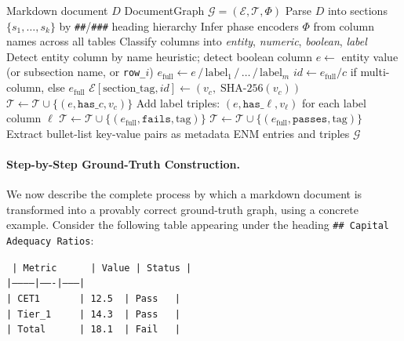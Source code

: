 \documentclass[11pt]{article}
\begin{document}
\begin{algorithm}[t]
\caption{Document Ingestion Pipeline}
\label{alg:ingest}
\begin{algorithmic}[1]
\REQUIRE Markdown document $D$
\ENSURE DocumentGraph $\mathcal{G} = (\mathcal{E}, \mathcal{T}, \Phi)$
\STATE Parse $D$ into sections $\{s_1, \ldots, s_k\}$ by \texttt{\#\#}/\texttt{\#\#\#} heading hierarchy
\STATE Infer phase encoders $\Phi$ from column names across all tables
    \STATE Classify columns into \textit{entity}, \textit{numeric}, \textit{boolean}, \textit{label}
    \STATE Detect entity column by name heuristic; detect boolean column
      \STATE $e \gets$ entity value (or subsection name, or \texttt{row\_$i$})
      \STATE $e_{\text{full}} \gets e\,/\,\text{label}_1\,/\,\ldots\,/\,\text{label}_m$ \hfill{}
        \STATE $\textit{id} \gets e_{\text{full}}/c$ if multi-column, else $e_{\text{full}}$
        \STATE $\mathcal{E}[\text{section\_tag}, \textit{id}] \gets (v_c,\; \text{SHA-256}(v_c))$
        \STATE $\mathcal{T} \gets \mathcal{T} \cup \{(e, \texttt{has\_}c, v_c)\}$
      \ENDFOR
      \STATE Add label triples: $(e, \texttt{has\_}\ell, v_\ell)$ for each label column $\ell$
        \STATE $\mathcal{T} \gets \mathcal{T} \cup \{(e_{\text{full}}, \texttt{fails}, \text{tag})\}$
        \STATE $\mathcal{T} \gets \mathcal{T} \cup \{(e_{\text{full}}, \texttt{passes}, \text{tag})\}$
      \ENDIF
    \ENDFOR
  \ENDFOR
  \STATE Extract bullet-list key-value pairs as metadata ENM entries and triples
\ENDFOR
\RETURN $\mathcal{G}$
\end{algorithmic}
\end{algorithm}

\paragraph{Step-by-Step Ground-Truth Construction.}
We now describe the complete process by which a markdown document is
transformed into a provably correct ground-truth graph, using a
concrete example.  Consider the following table appearing under the
heading \texttt{\#\# Capital Adequacy Ratios}:

\begin{mdframed}[style=graybox]\small\tt
| Metric~~~~~ | Value | Status |\\
|------------|-------|--------|\\
| CET1~~~~~~ | 12.5~ | Pass~~ |\\
| Tier\_1~~~~ | 14.3~ | Pass~~ |\\
| Total~~~~~ | 18.1~ | Fail~~ |
\end{mdframed}
\end{document}
